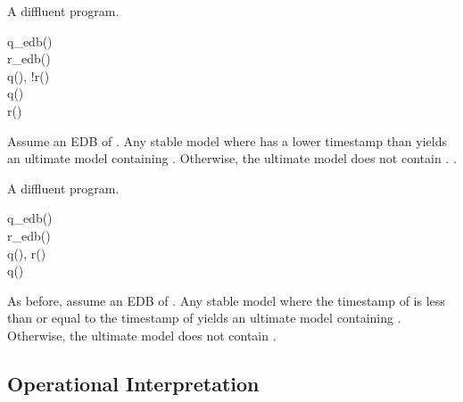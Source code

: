 \begin{example}
\label{ex:diffluent1}
A diffluent \lang program.


\begin{Drules}
        {q\_edb()} \\
        {r\_edb()} \\
        {q(), !r()} \\
        {q()} \\
        {r()}
\end{Drules}

Assume an EDB of .  Any stable model where  has a lower timestamp than  yields an ultimate model containing .  Otherwise, the ultimate model does not contain .  .
\end{example}

\begin{example}
\label{ex:diffluent2}
A diffluent \lang program.
\begin{Drules}
        {q\_edb()} \\
        {r\_edb()} \\
        {q(), r()} \\
        {q()}
\end{Drules}

As before, assume an EDB of .  Any stable model where the timestamp of  is less than or equal to the timestamp of  yields an ultimate model containing .  Otherwise, the ultimate model does not contain .
\end{example}

\subsection{Operational Interpretation}
\label{sec:operational}

